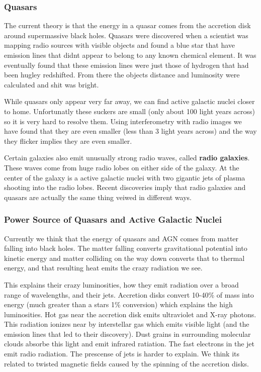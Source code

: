 \documentclass[12pt]{article}
\begin{document}
\subsubsection{Quasars}
The current theory is that the energy in a quasar comes from the accretion disk around supermassive black holes. Quasars were discovered when a scientist was mapping radio sources with visible objects and found a blue star that have emission lines that didnt appear to belong to any known chemical element. It was eventually found that these emission lines were just those of hydrogen that had been hugley redshifted. From there the objects distance and luminosity were calculated and shit was bright.

While quasars only appear very far away, we can find active galactic nuclei closer to home. Unfortunatly these suckers are small (only about 100 light years across) so it is very hard to resolve them. Using interferometry with radio images we have found that they are even smaller (less than 3 light years across) and the way they flicker implies they are even smaller.

Certain galaxies also emit unusually strong radio waves, called \textbf{radio galaxies}. These waves come from huge radio lobes on either side of the galaxy. At the center of the galaxy is a active galactic nuclei with two gigantic jets of plasma shooting into the radio lobes. Recent discoveries imply that radio galaxies and quasars are actually the same thing veiwed in different ways.

\subsubsection{Power Source of Quasars and Active Galactic Nuclei}
Currently we think that the energy of quasars and AGN comes from matter falling into black holes. The matter falling converts gravitational potential into kinetic energy and matter colliding on the way down converts that to thermal energy, and that resulting heat emits the crazy radiation we see.

This explains their crazy luminosities, how they emit radiation over a broad range of wavelengths, and their jets. Accretion disks convert 10-40\% of mass into energy (much greater than a stars 1\% conversion) which explains the high luminosities. Hot gas near the accretion disk emits ultraviolet and X-ray photons. This radiation ionizes near by interstellar gas which emits visible light (and the emission lines that led to their discovery). Dust grains in surrounding molecular clouds absorbe this light and emit infrared ratiation. The fast electrons in the jet emit radio radiation. The prescense of jets is harder to explain. We think its related to twisted magnetic fields caused by the spinning of the accretion disks.
\end{document}
